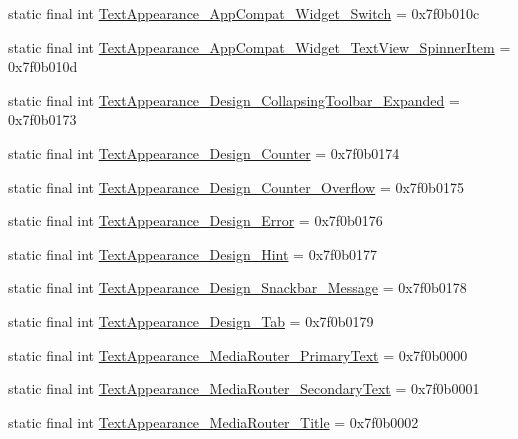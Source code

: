 \begin{CompactItemize}
\item 
static final int \hyperlink{classandroid_1_1support_1_1v7_1_1recyclerview_1_1_r_1_1style_3a3c3fa59a1b5b2fbc0bd26db7125b2e}{TextAppearance\_\-AppCompat\_\-Widget\_\-Switch} = 0x7f0b010c
\item 
static final int \hyperlink{classandroid_1_1support_1_1v7_1_1recyclerview_1_1_r_1_1style_cd98ba566ee46f2fe97bdc7a323ddf9e}{TextAppearance\_\-AppCompat\_\-Widget\_\-TextView\_\-SpinnerItem} = 0x7f0b010d
\item 
static final int \hyperlink{classandroid_1_1support_1_1v7_1_1recyclerview_1_1_r_1_1style_4f57c9fd398c53b3b0ef860bf091b36d}{TextAppearance\_\-Design\_\-CollapsingToolbar\_\-Expanded} = 0x7f0b0173
\item 
static final int \hyperlink{classandroid_1_1support_1_1v7_1_1recyclerview_1_1_r_1_1style_292fcb8f7e7d7e92ec4afaedd6f895af}{TextAppearance\_\-Design\_\-Counter} = 0x7f0b0174
\item 
static final int \hyperlink{classandroid_1_1support_1_1v7_1_1recyclerview_1_1_r_1_1style_f0cfcbd680dcf8da470072d649fba2c1}{TextAppearance\_\-Design\_\-Counter\_\-Overflow} = 0x7f0b0175
\item 
static final int \hyperlink{classandroid_1_1support_1_1v7_1_1recyclerview_1_1_r_1_1style_98d8402afdba147df64087dde1efcf4f}{TextAppearance\_\-Design\_\-Error} = 0x7f0b0176
\item 
static final int \hyperlink{classandroid_1_1support_1_1v7_1_1recyclerview_1_1_r_1_1style_da07c87ca8c6beb255c21de2cb99337c}{TextAppearance\_\-Design\_\-Hint} = 0x7f0b0177
\item 
static final int \hyperlink{classandroid_1_1support_1_1v7_1_1recyclerview_1_1_r_1_1style_1cc88ed33187a470fa2c129b15e2579f}{TextAppearance\_\-Design\_\-Snackbar\_\-Message} = 0x7f0b0178
\item 
static final int \hyperlink{classandroid_1_1support_1_1v7_1_1recyclerview_1_1_r_1_1style_35de183a58842b2f8d41c6bb34bf4cd7}{TextAppearance\_\-Design\_\-Tab} = 0x7f0b0179
\item 
static final int \hyperlink{classandroid_1_1support_1_1v7_1_1recyclerview_1_1_r_1_1style_d895d87b1bac646b2a9ce35fc62d10c1}{TextAppearance\_\-MediaRouter\_\-PrimaryText} = 0x7f0b0000
\item 
static final int \hyperlink{classandroid_1_1support_1_1v7_1_1recyclerview_1_1_r_1_1style_49ec1ce985ddc1bfaf27c570d35a49a0}{TextAppearance\_\-MediaRouter\_\-SecondaryText} = 0x7f0b0001
\item 
static final int \hyperlink{classandroid_1_1support_1_1v7_1_1recyclerview_1_1_r_1_1style_0a7e1a923959da8db7548c111d76b107}{TextAppearance\_\-MediaRouter\_\-Title} = 0x7f0b0002

\end{CompactItemize}
